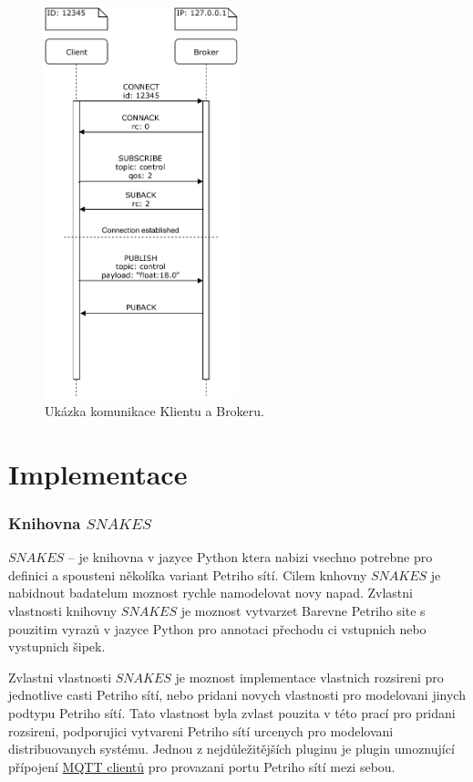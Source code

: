 \begin{figure}[hbt]
  \centering
  \includegraphics[width=0.5\textwidth]{obrazky-figures/MQTT-flow.pdf}
  \caption{Ukázka komunikace Klientu a Brokeru.}
  \label{mqtt-flow}
\end{figure}

\chapter{Implementace}
\label{sec:implementation}

\subsection{Knihovna $SNAKES$}

\href{https://www.ibisc.univ-evry.fr/~fpommereau/SNAKES/}{$SNAKES$} -- je knihovna v jazyce Python ktera nabizi vsechno potrebne pro definici a spousteni několíka variant Petriho sítí. Cilem knhovny $SNAKES$ je nabidnout badatelum moznost rychle namodelovat novy napad. Zvlastni vlastnosti knihovny $SNAKES$ je moznost vytvarzet Barevne Petriho site s pouzitim vyrazů v jazyce Python pro annotaci přechodu ci vstupnich nebo vystupnich šipek. \cite{snakes}

Zvlastni vlastnosti $SNAKES$ je moznost implementace vlastnich rozsireni pro jednotlive casti Petriho sítí, nebo pridani novych vlastnosti pro modelovani jinych podtypu Petriho sítí. Tato vlastnost byla zvlast pouzita v této prací pro pridani rozsireni, podporujici vytvareni Petriho sítí urcenych pro modelovani distribuovanych systému.
Jednou z nejdůležitějších pluginu je plugin umoznující přípojení \hyperref[sec:aplikace-mqtt]{MQTT clientů} pro provazani portu Petriho sítí mezi sebou.

